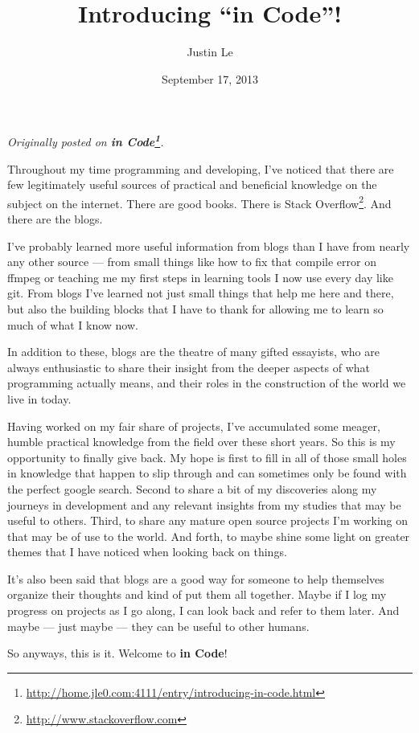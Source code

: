 \documentclass[]{article}
\title{Introducing ``in Code''!}
\author{Justin Le}
\date{September 17, 2013}
\renewcommand{\href}[2]{#2\footnote{\url{#1}}}
\begin{document}
\maketitle

\emph{Originally posted on
\textbf{\href{http://home.jle0.com:4111/entry/introducing-in-code.html}{in Code}}.}

Throughout my time programming and developing, I've noticed that there are few legitimately useful
sources of practical and beneficial knowledge on the subject on the internet. There are good books.
There is \href{http://www.stackoverflow.com}{Stack Overflow}. And there are the blogs.

I've probably learned more useful information from blogs than I have from nearly any other source
--- from small things like how to fix that compile error on ffmpeg or teaching me my first steps in
learning tools I now use every day like git. From blogs I've learned not just small things that help
me here and there, but also the building blocks that I have to thank for allowing me to learn so
much of what I know now.

In addition to these, blogs are the theatre of many gifted essayists, who are always enthusiastic to
share their insight from the deeper aspects of what programming actually means, and their roles in
the construction of the world we live in today.

Having worked on my fair share of projects, I've accumulated some meager, humble practical knowledge
from the field over these short years. So this is my opportunity to finally give back. My hope is
first to fill in all of those small holes in knowledge that happen to slip through and can sometimes
only be found with the perfect google search. Second to share a bit of my discoveries along my
journeys in development and any relevant insights from my studies that may be useful to others.
Third, to share any mature open source projects I'm working on that may be of use to the world. And
forth, to maybe shine some light on greater themes that I have noticed when looking back on things.

It's also been said that blogs are a good way for someone to help themselves organize their thoughts
and kind of put them all together. Maybe if I log my progress on projects as I go along, I can look
back and refer to them later. And maybe --- just maybe --- they can be useful to other humans.

So anyways, this is it. Welcome to \textbf{in Code}!
\end{document}
